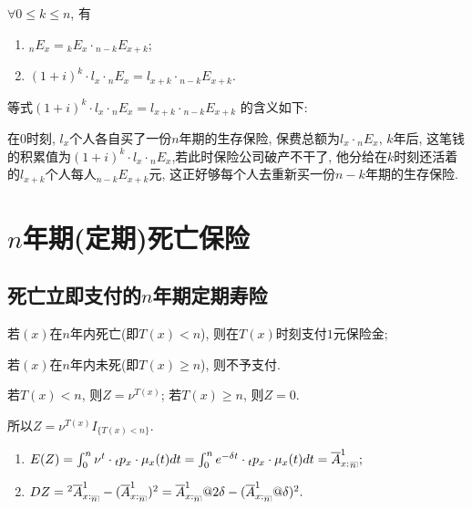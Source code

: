 \documentclass[lang=cn,10pt]{elegantbook}
\makeatletter
\DeclareRobustCommand{\annu}[1]{_{%
    \def\arraystretch{0}%
    \setlength\arraycolsep{1pt}%
    \setlength\arrayrulewidth{.2pt}%
    \begin{array}[b]{@{}c|}\hline
        \\[\arraycolsep]%
        \scriptstyle #1%
    \end{array}%
}}
\makeatother
\begin{document}
\begin{corollary}[精算现值的性质]
    $\forall 0\leqslant k\leqslant n$, 有
    \begin{enumerate}
        \item $_nE_x={}_kE_x\cdot {}_{n-k}E_{x+k}$;
        \item $(1+i)^k\cdot l_x\cdot{}_nE_x=l_{x+k}\cdot {}_{n-k}E_{x+k}$.
    \end{enumerate}
\end{corollary}

\begin{remark}
    等式$(1+i)^k\cdot l_x\cdot {}_nE_x=l_{x+k}\cdot {}_{n-k}E_{x+k}$ 的含义如下:

    在$0$时刻, $l_x$个人各自买了一份$n$年期的生存保险, 保费总额为$l_x\cdot {}_nE_x$, $k$年后, 这笔钱的积累值为$(1+i)^k\cdot l_x\cdot {}_nE_x$,若此时保险公司破产不干了, 他分给在$k$时刻还活着的$l_{x+k}$个人每人${}_{n-k}E_{x+k}$元, 这正好够每个人去重新买一份$n-k$年期的生存保险.
\end{remark}

\section{$n$年期(定期)死亡保险}

\subsection{死亡立即支付的$n$年期定期寿险}
\begin{definition}[支付现值]
    若$(x)$在$n$年内死亡(即$T(x)<n$), 则在$T(x)$时刻支付$1$元保险金;

    若$(x)$在$n$年内未死(即$T(x)\geqslant n$), 则不予支付.

    若$T(x)<n$, 则$Z=\nu^{T(x)}$; 若$T(x)\geqslant n$, 则$Z=0$.

    所以$Z=\nu^{T(x)}I_{\{T(x)<n\}}.$
\end{definition}

\begin{proposition}[精算现值与方差]
    \begin{enumerate}
        \item $E(Z)=\int_0^{n}{\nu^{t}\cdot {}_tp_x\cdot \mu_{x}(t)dt}=\int_0^{n}{e^{-\delta t}\cdot {}_tp_x\cdot \mu_{x}(t)dt}=\overline{A}_{x:}^1{}_{{}\annu{n}};$
        \item $DZ={}^2\overline{A}_{x:\annu{n}}^1-(\overline{A}_{x:\annu{n}}^1)^2=\overline{A}_{x:\annu{n}}^1@2\delta-(\overline{A}_{x:\annu{n}}^1@\delta)^2.$
    \end{enumerate}
\end{proposition}
\end{document}
